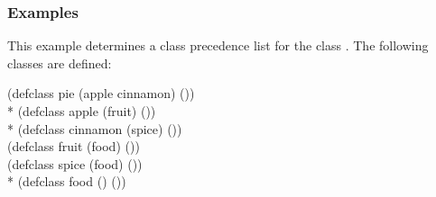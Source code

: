 \subsubsection{Examples}

This example determines a class precedence list for the
class .  The following classes are defined:

\begin{lisp}
(defclass pie (apple cinnamon) ()) \\*
(defclass apple (fruit) ()) \\*
(defclass cinnamon (spice) ()) \\
(defclass fruit (food) ()) \\
(defclass spice (food) ()) \\*
(defclass food () ())
\end{lisp}

